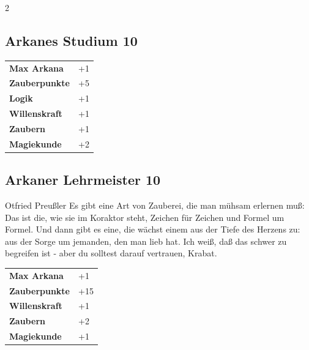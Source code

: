\begin{multicols}{2}
\begin{tcolorbox}
\end{tcolorbox}

\begin{tcolorbox}
    \subsection*{Arkanes Studium \hfill \small{10 }}
    \tcblower




\begin{tabular}{@{}ll@{}}
    \textbf{Max Arkana} & +1\\
    \textbf{Zauberpunkte} & +5\\
    \textbf{Logik} & +1\\
    \textbf{Willenskraft} & +1\\
    \textbf{Zaubern} & +1\\
    \textbf{Magiekunde} & +2\\
\end{tabular}


\end{tcolorbox}

\begin{tcolorbox}
    \subsection*{Arkaner Lehrmeister \hfill \small{10 }}
    \tcblower


\begin{pquote}{Otfried Preußler}
Es gibt eine Art von Zauberei, die man mühsam erlernen muß: Das ist die, wie sie im Koraktor steht, Zeichen für Zeichen und Formel um Formel. Und dann gibt es eine, die wächst einem aus der Tiefe des Herzens zu: aus der Sorge um jemanden, den man lieb hat. Ich weiß, daß das schwer zu begreifen ist - aber du solltest darauf vertrauen, Krabat.
\end{pquote}

\vspace{3mm}

\begin{tabular}{@{}ll@{}}
    \textbf{Max Arkana} & +1\\
    \textbf{Zauberpunkte} & +15\\
    \textbf{Willenskraft} & +1\\
    \textbf{Zaubern} & +2\\
    \textbf{Magiekunde} & +1\\
\end{tabular}


\end{tcolorbox}
\end{multicols}
